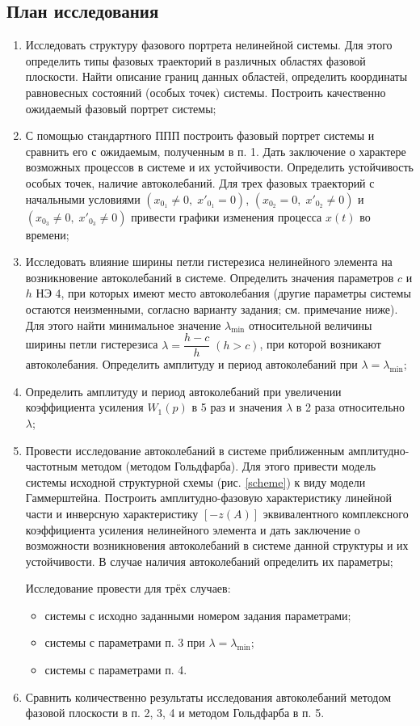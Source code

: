 	\subsection{План исследования}
	
	\begin{enumerate}
		\item Исследовать структуру фазового портрета нелинейной системы. Для этого определить типы фазовых траекторий в различных областях фазовой плоскости. Найти описание границ данных областей, определить координаты равновесных состояний (особых точек) системы. Построить качественно ожидаемый фазовый портрет системы;
		\item С помощью стандартного ППП построить фазовый портрет системы и сравнить его с ожидаемым, полученным в п. 1. Дать заключение о характере возможных процессов в системе и их устойчивости. Определить устойчивость особых точек, наличие автоколебаний. Для трех фазовых траекторий с начальными условиями $(x_{0_1} \neq 0,\;x'_{0_1}=0)$,  $(x_{0_2} = 0,\;x'_{0_2} 
		\neq 0)$ и $(x_{0_3}\neq 0,\;x'_{0_3}\neq 0)$ привести графики изменения процесса $x(t)$ во времени;
		\item Исследовать влияние ширины петли гистерезиса нелинейного элемента на возникновение автоколебаний в системе. Определить значения параметров $c$ и $h$ НЭ 4, при которых имеют место автоколебания (другие параметры системы остаются неизменными, согласно варианту задания; см. примечание ниже). Для этого найти минимальное значение $\lambda_{\min}$ относительной величины ширины петли гистерезиса $\lambda = \dfrac{h-c}{h}\;(h>c)$, при которой возникают автоколебания. Определить амплитуду и
		период автоколебаний при $\lambda = \lambda_{\min}$;
		\item Определить амплитуду и период автоколебаний при увеличении коэффициента усиления
		$W_1(p)$ в 5 раз и значения $\lambda$ в 2 раза относительно $\lambda$;
		\item Провести исследование автоколебаний в системе приближенным амплитудно-частотным методом (методом Гольдфарба). Для этого привести модель системы исходной структурной схемы (рис. \ref{scheme}) к виду модели Гаммерштейна. Построить амплитудно-фазовую характеристику линейной части и инверсную характеристику $[-z(A)]$ эквивалентного
		комплексного коэффициента усиления нелинейного элемента и дать заключение о возможности возникновения автоколебаний в системе данной структуры и их устойчивости. В случае наличия автоколебаний	определить их параметры;
		
		Исследование провести для трёх случаев:
		\begin{itemize}
			\item системы с исходно заданными номером задания параметрами;
			\item системы с параметрами п. 3 при $\lambda = \lambda_{\min}$;
			\item системы с параметрами п. 4.
		\end{itemize}
		\item Сравнить количественно результаты исследования автоколебаний методом фазовой плоскости в п. 2, 3, 4 и методом Гольдфарба в п. 5.
	\end{enumerate}
	
